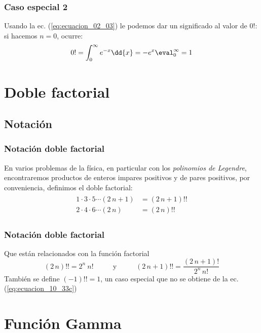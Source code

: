 \begin{frame}
\frametitle{Caso especial 2}
Usando la ec. (\ref{eq:ecuacion_02_03}) le podemos dar un significado al valor de $0!$: si hacemos $n = 0$, ocurre:
\begin{align}
0! = \int_{0}^{\infty} e^{-x} \dd{x} = -e^{x}\eval_{0}^{\infty} = 1
\label{eq:ecuacion_02_04}
\end{align}
\end{frame}
\section{Doble factorial}
\subsection{Notación}
\begin{frame}
\frametitle{Notación doble factorial}
En varios problemas de la física, en particular con los \emph{polinomios de Legendre}, encontraremos productos de enteros impares positivos y de pares positivos, por conveniencia, definimos el doble factorial:
\begin{align}
\begin{aligned}
1 \cdot 3 \cdot 5 \cdots (2 \, n+1) &= (2 \, n+1) !! \\
2 \cdot 4 \cdot 6 \cdots (2 \, n) &= (2 \, n) !!
\end{aligned}
\label{eq:ecuacion_10_33b}
\end{align}
\end{frame}
\begin{frame}
\frametitle{Notación doble factorial}
Que están relacionados con la función factorial
\begin{equation}
(2 \, n)!! =  2^{n} \: n! \hspace{1cm} \mbox{ y } \hspace{1cm} (2 \, n+1)!! = \dfrac{(2 \, n+1)!}{2^{n} \, n!}
\label{eq:ecuacion_10_33c}
\end{equation}
También se define $(-1)!! = 1$, un caso especial que no se obtiene de la ec. (\ref{eq:ecuacion_10_33c})
\end{frame}
\section{Función Gamma}
